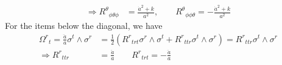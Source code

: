 \documentclass[a4paper, 11pt]{article}
\newenvironment{solution}{%
	\begin{list}{}{%
			\setlength{\topsep}{0pt}%
			\setlength{\leftmargin}{0.5cm}%
			\setlength{\rightmargin}{0.5cm}%
			\setlength{\listparindent}{\parindent}%
			\setlength{\itemindent}{\parindent}%
			\setlength{\parsep}{\parskip}%
		}%
		\item[]}{\end{list}}
\begin{document}
\begin{enumerate}[leftmargin=0em, label=\textbf{\arabic*}.]
\begin{solution}
\begin{align}
        \Rightarrow R^\theta{}_{\phi \theta \phi} &= \frac{\dot{a}^2+k}{a^2},\qquad R^\theta{}_{\phi\phi \theta}=- \frac{\dot{a}^2+k}{a^2}
      \end{align}
      For the items below the diagonal, we have
      \begin{align}
        \Omega^r{}_t = \frac{\ddot{a}}{a}\sigma^t\wedge\sigma^r &= \frac{1}{2}\left( R^r{}_{trt}\sigma^r\wedge\sigma^t+R^r{}_{ttr}\sigma^t\wedge\sigma^r \right) = R^r{}_{ttr}\sigma^t\wedge\sigma^r\\
        \Rightarrow R^r{}_{ttr} &= \frac{\ddot{a}}{a} \qquad R^r{}_{trt} = -\frac{\ddot{a}}{a} \\

\end{align}
\end{solution}
\end{enumerate}
\end{document}
